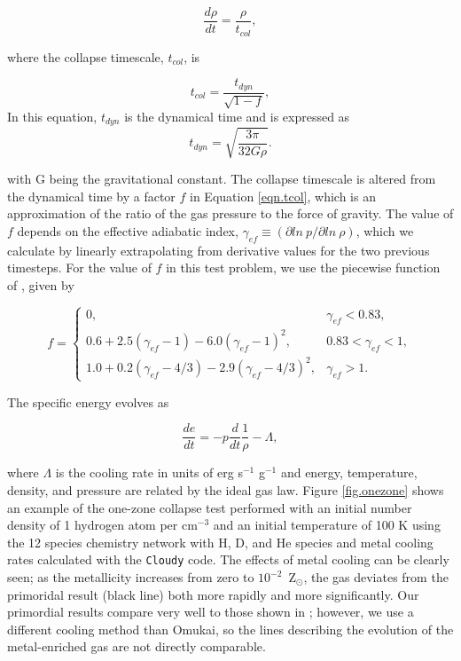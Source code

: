 \begin{equation}
\frac{d\rho}{dt} = \frac{\rho}{t_{col}},
\end{equation}

where the collapse timescale, $t_{col}$, is

\begin{equation} \label{eqn.tcol}
t_{col} = \frac{t_{dyn}}{\sqrt{1 - f}},
\end{equation}
In this equation, $t_{dyn}$ is the dynamical time and is expressed as
\begin{equation}
t_{dyn} = \sqrt{\frac{3 \pi}{32 G \rho}}.
\end{equation}

with G being the gravitational constant.  The collapse timescale is
altered from the dynamical time by a factor $f$ in Equation
\ref{eqn.tcol}, which is an approximation of the ratio of the gas
pressure to the force of gravity.  The value of $f$ depends on the
effective adiabatic index, $\gamma_{ef} \equiv (\partial ln\ p
/ \partial ln\ \rho)$, which we calculate by linearly extrapolating
from derivative values for the two previous timesteps.  For the value
of $f$ in this test problem, we use the piecewise function of
\citet{2005ApJ...626..627O}, given by

\begin{equation}
f = \left\{
  \begin{array}{ll}
  0, & \gamma_{ef} < 0.83,\\
  0.6 + 2.5 (\gamma_{ef} - 1) - 6.0 (\gamma_{ef} - 1)^{2}, & 0.83 <
  \gamma_{ef} < 1,\\
  1.0 + 0.2 (\gamma_{ef} - 4/3) - 2.9 (\gamma_{ef} - 4/3)^{2}, & \gamma_{ef} > 1.
\end{array} \right.
\end{equation}

The specific energy evolves as

\begin{equation}
\frac{de}{dt} = -p \frac{d}{dt} \frac{1}{\rho} - \Lambda,
\end{equation}

where $\Lambda$ is the cooling rate in units of erg s$^{-1}$ g$^{-1}$
and energy, temperature, density, and pressure are related by the
ideal gas law.  Figure \ref{fig.onezone} shows an example of the
one-zone collapse test performed with an initial number density of 1
hydrogen atom per cm$^{-3}$ and an initial temperature of 100 K using
the 12 species chemistry network with H, D, and He species and metal
cooling rates calculated with the \texttt{Cloudy} code.  The effects
of metal cooling can be clearly seen; as the metallicity increases
from zero to $10^{-2}$~Z$_\odot$, the gas deviates from the primoridal
result (black line) both more rapidly and more significantly.  Our
primordial results compare very well to those shown in
\citet{2005ApJ...626..627O}; however, we use a different cooling
method than Omukai, so the lines describing the evolution of the
metal-enriched gas are not directly comparable.

